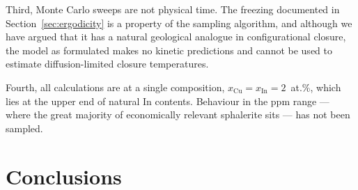 \documentclass[11pt,a4paper]{article}
\begin{document}
Third, Monte Carlo sweeps are not physical time. The freezing documented in
Section~\ref{sec:ergodicity} is a property of the sampling algorithm, and
although we have argued that it has a natural geological analogue in
configurational closure, the model as formulated makes no kinetic predictions
and cannot be used to estimate diffusion-limited closure temperatures.

Fourth, all calculations are at a single composition,
$x_{\mathrm{Cu}} = x_{\mathrm{In}} = 2$~at.\%, which lies at the upper end of
natural In contents. Behaviour in the ppm range --- where the great majority of
economically relevant sphalerite sits --- has not been sampled.

\section{Conclusions}
\end{document}
